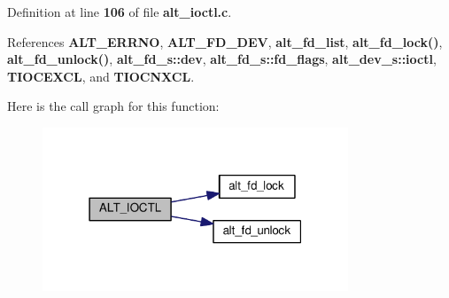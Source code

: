 Definition at line {\bf 106} of file {\bf alt\+\_\+ioctl.\+c}.



References {\bf A\+L\+T\+\_\+\+E\+R\+R\+NO}, {\bf A\+L\+T\+\_\+\+F\+D\+\_\+\+D\+EV}, {\bf alt\+\_\+fd\+\_\+list}, {\bf alt\+\_\+fd\+\_\+lock()}, {\bf alt\+\_\+fd\+\_\+unlock()}, {\bf alt\+\_\+fd\+\_\+s\+::dev}, {\bf alt\+\_\+fd\+\_\+s\+::fd\+\_\+flags}, {\bf alt\+\_\+dev\+\_\+s\+::ioctl}, {\bf T\+I\+O\+C\+E\+X\+CL}, and {\bf T\+I\+O\+C\+N\+X\+CL}.



Here is the call graph for this function\+:
\nopagebreak
\begin{figure}[H]
\begin{center}
\leavevmode
\includegraphics[width=259pt]{dd/d2a/alt__ioctl_8c_a0883772795b24615304d5c9752f7000a_cgraph}
\end{center}
\end{figure}


